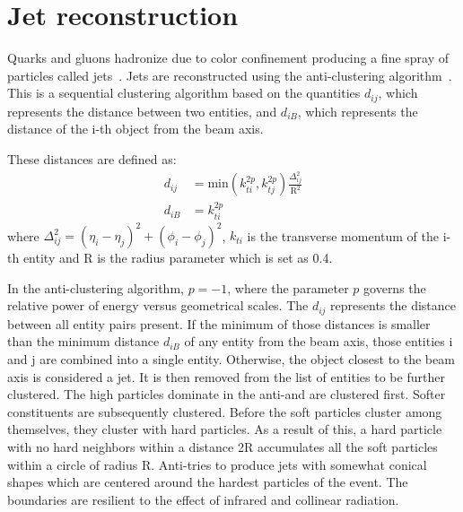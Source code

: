 \section{Jet reconstruction}

Quarks and gluons hadronize due to color confinement producing a fine spray of particles called jets~\cite{Cacciari:2008gp}. Jets are reconstructed using the anti-\kt clustering algorithm~\cite{Cacciari:2011ma}. This is a sequential clustering algorithm based on the quantities $d_{ij}$, which represents the distance between two entities, and $d_{iB}$, which represents the distance of the i-th object from the beam axis.

These distances are defined as:
\begin{equation}
  \begin{aligned}
  d_{ij}&= \text{min}(k_{ti}^{2p},k_{tj}^{2p})\frac{\Delta_{ij}^{2}}{\text{R}^2} \\
  d_{iB}&=k_{ti}^{2p}
  \end{aligned}
\end{equation}
where $\Delta_{ij}^{2}=(\eta_i-\eta_j)^2+(\phi_i-\phi_j)^2$, $k_{ti}$ is the transverse momentum of the i-th entity and R is the radius parameter which is set as 0.4.

In the anti-\kt clustering algorithm, $p=-1$, where the parameter $p$ governs the relative power of energy versus geometrical scales. The $d_{ij}$ represents the distance between all entity pairs present. If the minimum of those distances is smaller than the minimum distance $d_{iB}$ of any entity from the beam axis, those entities i and j are combined into a single entity. Otherwise, the object closest to the beam axis is considered a jet. It is then removed from the list of entities to be further clustered. The high \pt particles dominate in the anti-\kt and are clustered first. Softer constituents are subsequently clustered. Before the soft particles cluster among themselves, they cluster with hard particles. As a result of this, a hard particle with no hard neighbors within a distance 2R accumulates all the soft particles within a circle of radius R. Anti-\kt tries to produce jets with somewhat conical shapes which are centered around the hardest particles of the event. The boundaries are resilient to the effect of infrared and collinear radiation.

